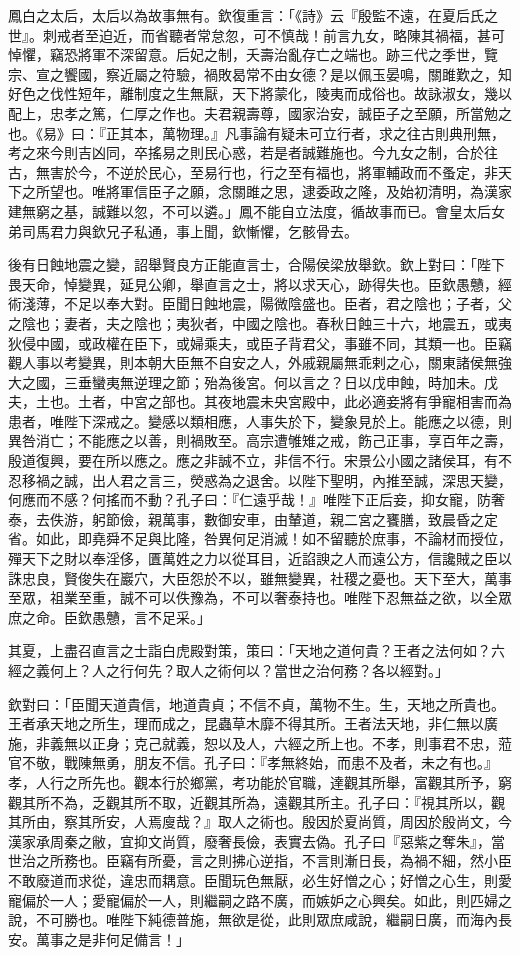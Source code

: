\begin{pinyinscope}
鳳白之太后，太后以為故事無有。欽復重言：「《詩》云『殷監不遠，在夏后氏之世』。刺戒者至迫近，而省聽者常怠忽，可不慎哉！前言九女，略陳其禍福，甚可悼懼，竊恐將軍不深留意。后妃之制，夭壽治亂存亡之端也。跡三代之季世，覽宗、宣之饗國，察近屬之符驗，禍敗曷常不由女德？是以佩玉晏鳴，關雎歎之，知好色之伐性短年，離制度之生無厭，天下將蒙化，陵夷而成俗也。故詠淑女，幾以配上，忠孝之篤，仁厚之作也。夫君親壽尊，國家治安，誠臣子之至願，所當勉之也。《易》曰：『正其本，萬物理。』凡事論有疑未可立行者，求之往古則典刑無，考之來今則吉凶同，卒搖易之則民心惑，若是者誠難施也。今九女之制，合於往古，無害於今，不逆於民心，至易行也，行之至有福也，將軍輔政而不蚤定，非天下之所望也。唯將軍信臣子之願，念關雎之思，逮委政之隆，及始初清明，為漢家建無窮之基，誠難以忽，不可以遴。」鳳不能自立法度，循故事而已。會皇太后女弟司馬君力與欽兄子私通，事上聞，欽慚懼，乞骸骨去。

後有日蝕地震之變，詔舉賢良方正能直言士，合陽侯梁放舉欽。欽上對曰：「陛下畏天命，悼變異，延見公卿，舉直言之士，將以求天心，跡得失也。臣欽愚戇，經術淺薄，不足以奉大對。臣聞日蝕地震，陽微陰盛也。臣者，君之陰也；子者，父之陰也；妻者，夫之陰也；夷狄者，中國之陰也。春秋日蝕三十六，地震五，或夷狄侵中國，或政權在臣下，或婦乘夫，或臣子背君父，事雖不同，其類一也。臣竊觀人事以考變異，則本朝大臣無不自安之人，外戚親屬無乖剌之心，關東諸侯無強大之國，三垂蠻夷無逆理之節；殆為後宮。何以言之？日以戊申蝕，時加未。戊夫，土也。土者，中宮之部也。其夜地震未央宮殿中，此必適妾將有爭寵相害而為患者，唯陛下深戒之。變感以類相應，人事失於下，變象見於上。能應之以德，則異咎消亡；不能應之以善，則禍敗至。高宗遭雊雉之戒，飭己正事，享百年之壽，殷道復興，要在所以應之。應之非誠不立，非信不行。宋景公小國之諸侯耳，有不忍移禍之誠，出人君之言三，熒惑為之退舍。以陛下聖明，內推至誠，深思天變，何應而不感？何搖而不動？孔子曰：『仁遠乎哉！』唯陛下正后妾，抑女寵，防奢泰，去佚游，躬節儉，親萬事，數御安車，由輦道，親二宮之饔膳，致晨昏之定省。如此，即堯舜不足與比隆，咎異何足消滅！如不留聽於庶事，不論材而授位，殫天下之財以奉淫侈，匱萬姓之力以從耳目，近諂諛之人而遠公方，信讒賊之臣以誅忠良，賢俊失在巖穴，大臣怨於不以，雖無變異，社稷之憂也。天下至大，萬事至眾，祖業至重，誠不可以佚豫為，不可以奢泰持也。唯陛下忍無益之欲，以全眾庶之命。臣欽愚戇，言不足采。」

其夏，上盡召直言之士詣白虎殿對策，策曰：「天地之道何貴？王者之法何如？六經之義何上？人之行何先？取人之術何以？當世之治何務？各以經對。」

欽對曰：「臣聞天道貴信，地道貴貞；不信不貞，萬物不生。生，天地之所貴也。王者承天地之所生，理而成之，昆蟲草木靡不得其所。王者法天地，非仁無以廣施，非義無以正身；克己就義，恕以及人，六經之所上也。不孝，則事君不忠，蒞官不敬，戰陳無勇，朋友不信。孔子曰：『孝無終始，而患不及者，未之有也。』孝，人行之所先也。觀本行於鄉黨，考功能於官職，達觀其所舉，富觀其所予，窮觀其所不為，乏觀其所不取，近觀其所為，遠觀其所主。孔子曰：『視其所以，觀其所由，察其所安，人焉廋哉？』取人之術也。殷因於夏尚質，周因於殷尚文，今漢家承周秦之敝，宜抑文尚質，廢奢長儉，表實去偽。孔子曰『惡紫之奪朱』，當世治之所務也。臣竊有所憂，言之則拂心逆指，不言則漸日長，為禍不細，然小臣不敢廢道而求從，違忠而耦意。臣聞玩色無厭，必生好憎之心；好憎之心生，則愛寵偏於一人；愛寵偏於一人，則繼嗣之路不廣，而嫉妒之心興矣。如此，則匹婦之說，不可勝也。唯陛下純德普施，無欲是從，此則眾庶咸說，繼嗣日廣，而海內長安。萬事之是非何足備言！」


\end{pinyinscope}
